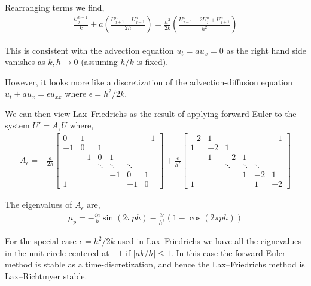 \documentclass[12pt]{article}
\begin{document}
Rearranging terms we find,
\begin{align*}
    \frac{U_j^{n+1}}{k} + a \left( \frac{U_{j+1}^n-U_{j-1}^n}{2h} \right) = \frac{h^2}{2k} \left( \frac{U_{j-1}^n-2U_j^n + U_{j+1}^n}{h^2} \right)
\end{align*}

This is consistent with the advection equation \( u_t = a u_x = 0 \) as the right hand side vanishes as \( k,h\to 0 \) (assuming \( h/k \) is fixed).

However, it looks more like a discretization of the advection-diffusion equation \( u_t +au_x = \epsilon u_{xx} \) where \( \epsilon = h^2/2k \).

We can then view Lax--Friedrichs as the result of applying forward Euler to the system \( U' = A_\epsilon U \) where,
\begin{align*}
    A_\epsilon = -\frac{a}{2h} 
    \left[\begin{array}{cccccc}
        0 & 1 & & & & -1 \\
        -1 & 0 & 1\\
        &-1 & 0 & 1\\
        & &\ddots &\ddots & \ddots \\
        & & & -1 & 0 & 1 \\
        1 & & & & -1 & 0
    \end{array}\right]
    +\frac{\epsilon}{h^2}
    \left[\begin{array}{cccccc}
        -2 & 1 & & & & -1 \\
        1 & -2 & 1\\
        &1 & -2 & 1\\
        & &\ddots &\ddots & \ddots \\
        & & & 1 & -2 & 1 \\
        1 & & & & 1 & -2
    \end{array}\right]
\end{align*}

The eigenvalues of \( A_\epsilon \) are,
\begin{align*}
    \mu_p = -\frac{ia}{h}\sin(2\pi ph) - \frac{2\epsilon}{h^2}(1-\cos(2\pi ph))
\end{align*}

For the special case \( \epsilon = h^2/2k \) used in Lax--Friedrichs we have all the eignevalues in the unit circle centered at \( -1 \) if \( |ak/h|\leq 1 \). In this case the forward Euler method is stable as a time-discretization, and hence the Lax--Friedrichs method is Lax--Richtmyer stable.
\end{document}
